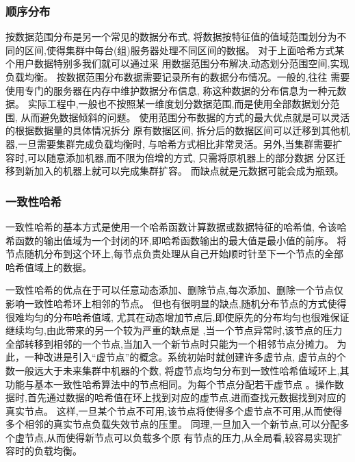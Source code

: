 \subsubsection{顺序分布}
按数据范围分布是另一个常见的数据分布式,
将数据按特征值的值域范围划分为不同的区间,使得集群中每台(组)服务器处理不同区间的数据。
对于上面哈希方式某个用户数据特别多我们就可以通过采
用数据范围分布解决,动态划分范围空间,实现负载均衡。 
按数据范围分布数据需要记录所有的数据分布情况。一般的,往往
需要使用专门的服务器在内存中维护数据分布信息, 称这种数据的分布信息为一种元数据。 
实际工程中,一般也不按照某一维度划分数据范围,而是使用全部数据划分范围,
从而避免数据倾斜的问题。 
使用范围分布数据的方式的最大优点就是可以灵活的根据数据量的具体情况拆分
原有数据区间, 拆分后的数据区间可以迁移到其他机器,一旦需要集群完成负载均衡时,
与哈希方式相比非常灵活。另外,当集群需要扩容时,可以随意添加机器,而不限为倍增的方式,
只需将原机器上的部分数据 分区迁移到新加入的机器上就可以完成集群扩容。
而缺点就是元数据可能会成为瓶颈。 
\subsubsection{一致性哈希}
一致性哈希的基本方式是使用一个哈希函数计算数据或数据特征的哈希值,
令该哈希函数的输出值域为一个封闭的环,即哈希函数输出的最大值是最小值的前序。
将节点随机分布到这个环上,每节点负责处理从自己开始顺时针至下一个节点的全部哈希值域上的数据。 

一致性哈希的优点在于可以任意动态添加、删除节点,每次添加、删除一个节点仅影响一致性哈希环上相邻的节点。 
但也有很明显的缺点,随机分布节点的方式使得很难均匀的分布哈希值域,
尤其在动态增加节点后,即使原先的分布均匀也很难保证继续均匀,由此带来的另一个较为严重的缺点是
,当一个节点异常时,该节点的压力全部转移到相邻的一个节点,当加入一个新节点时只能为一个相邻节点分摊力。 
为此，一种改进是引入“虚节点”的概念。系统初始时就创建许多虚节点, 虚节点的个数一般远大于未来集群中机器的个数,
将虚节点均匀分布到一致性哈希值域环上,其功能与基本一致性哈希算法中的节点相同。为每个节点分配若干虚节点
。操作数据时,首先通过数据的哈希值在环上找到对应的虚节点,进而查找元数据找到对应的真实节点。
这样,一旦某个节点不可用,该节点将使得多个虚节点不可用,从而使得多个相邻的真实节点负载失效节点的压里。
同理,一旦加入一个新节点,可以分配多个虚节点,从而使得新节点可以负载多个原
有节点的压力,从全局看,较容易实现扩容时的负载均衡。 
